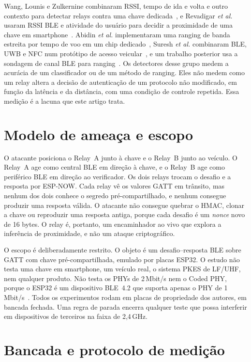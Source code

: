 \documentclass{ieeeaccess}
\begin{document}
Wang, Lounis e Zulkernine combinaram RSSI, tempo de ida e volta e outro contexto para detectar relays contra uma chave dedicada~\cite{b22}, e Revadigar \emph{et al.} usaram RSSI BLE e atividade do usuário para decidir a proximidade de uma chave em smartphone~\cite{b23}. Abidin \emph{et al.} implementaram uma ranging de banda estreita por tempo de voo em um chip dedicado~\cite{b24}, Suresh \emph{et al.} combinaram BLE, UWB e NFC num protótipo de acesso veicular~\cite{b10}, e um trabalho posterior usa a sondagem de canal BLE para ranging~\cite{b26}. Os detectores desse grupo medem a acurácia de um classificador ou de um método de ranging. Eles não medem como um relay altera a decisão de autenticação de um protocolo não modificado, em função da latência e da distância, com uma condição de controle repetida. Essa medição é a lacuna que este artigo trata.

\section{Modelo de ameaça e escopo}
\label{sec:threat}

O atacante posiciona o Relay~A junto à chave e o Relay~B junto ao veículo. O Relay~A age como central BLE em direção à chave, e o Relay~B age como periférico BLE em direção ao verificador. Os dois relays trocam o desafio e a resposta por ESP-NOW. Cada relay vê os valores GATT em trânsito, mas nenhum dos dois conhece o segredo pré-compartilhado, e nenhum consegue produzir uma resposta válida. O atacante não consegue quebrar o HMAC, clonar a chave ou reproduzir uma resposta antiga, porque cada desafio é um \emph{nonce} novo de 16 bytes. O relay é, portanto, um encaminhador ao vivo que explora a inferência de proximidade, e não um ataque criptográfico.

O escopo é deliberadamente restrito. O objeto é um desafio--resposta BLE sobre GATT com chave pré-compartilhada, emulado por placas ESP32. O estudo não testa uma chave em smartphone, um veículo real, o sistema PKES de LF/UHF, nem qualquer produto. Não testa os PHYs de 2\,Mbit/s nem o Coded PHY, porque o ESP32 é um dispositivo BLE~4.2 que suporta apenas o PHY de 1\,Mbit/s~\cite{b29}. Todos os experimentos rodam em placas de propriedade dos autores, em bancada fechada. Uma regra de parada encerra qualquer teste que possa interferir em dispositivos de terceiros na faixa de 2,4\,GHz.

\section{Bancada e protocolo de medição}
\label{sec:bench}
\end{document}
